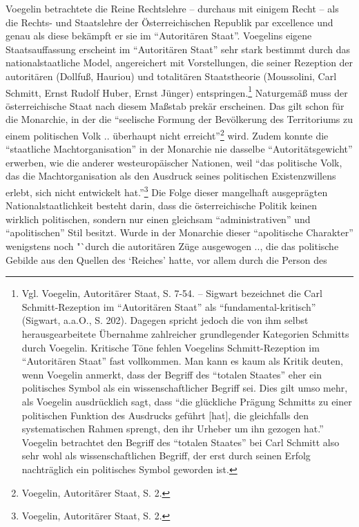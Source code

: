 \documentclass[12pt,a4paper,ngerman]{article}
\begin{document}
Voegelin betrachtete die Reine Rechtslehre -- durchaus mit einigem Recht --
als die Rechts- und Staatslehre der Österreichischen Republik par excellence
und genau als diese bekämpft er sie im "`Autoritären Staat"'.  Voegelins
eigene Staatsauffassung erscheint im "`Autoritären Staat"' sehr stark bestimmt
durch das nationalstaatliche Model, angereichert mit Vorstellungen, die seiner
Rezeption der autoritären (Dollfuß, Hauriou) und totalitären Staatstheorie
(Moussolini, Carl Schmitt, Ernst Rudolf Huber, Ernst Jünger)
entspringen.\footnote{Vgl.  Voegelin, Autoritärer Staat, S. 7-54. -- Sigwart
  bezeichnet die Carl Schmitt-Rezeption im "`Autoritären Staat"' als
  "`fundamental-kritisch"' (Sigwart, a.a.O., S. 202). Dagegen spricht jedoch
  die von ihm selbst herausgearbeitete Übernahme zahlreicher grundlegender
  Kategorien Schmitts durch Voegelin. Kritische Töne fehlen Voegelins
  Schmitt-Rezeption im "`Autoritären Staat"' fast vollkommen. Man kann es kaum
  als Kritik deuten, wenn Voegelin anmerkt, dass der Begriff des "`totalen
  Staates"' eher ein politisches Symbol als ein wissenschaftlicher Begriff
  sei. Dies gilt umso mehr, als Voegelin ausdrücklich sagt, dass "`die
  glückliche Prägung Schmitts zu einer politischen Funktion des Ausdrucks
  geführt [hat], die gleichfalls den systematischen Rahmen sprengt, den ihr
  Urheber um ihn gezogen hat."' Voegelin betrachtet den Begriff des "`totalen
  Staates"' bei Carl Schmitt also sehr wohl als wissenschaftlichen Begriff,
  der erst durch seinen Erfolg nachträglich ein politisches Symbol geworden
  ist.} Naturgemäß muss der österreichische Staat nach diesem Maßstab prekär
erscheinen. Das gilt schon für die Monarchie, in der die "`seelische Formung
der Bevölkerung des Territoriums zu einem politischen Volk ..  überhaupt nicht
erreicht"'\footnote{Voegelin, Autoritärer Staat, S.  2.} wird.  Zudem konnte
die "`staatliche Machtorganisation"' in der Monarchie nie dasselbe
"`Autoritätsgewicht"' erwerben, wie die anderer westeuropäischer Nationen,
weil "`das politische Volk, das die Machtorganisation als den Ausdruck seines
politischen Existenzwillens erlebt, sich nicht entwickelt
hat."'\footnote{Voegelin, Autoritärer Staat, S. 2.} Die Folge dieser
mangelhaft ausgeprägten Nationalstaatlichkeit besteht darin, dass die
österreichische Politik keinen wirklich politischen, sondern nur einen
gleichsam "`administrativen"' und "`apolitischen"' Stil besitzt.  Wurde in der
Monarchie dieser "`apolitische Charakter"' wenigstens noch "`durch die
autoritären Züge ausgewogen .., die das politische Gebilde aus den Quellen des
`Reiches' hatte, vor allem durch die Person des
\end{document}
